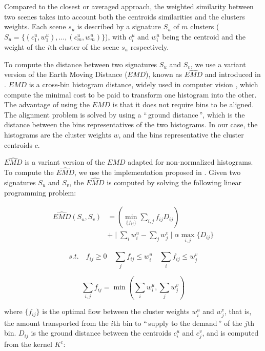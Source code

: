 \documentclass[journal]{IEEEtran}
\begin{document}
Compared to the closest or averaged approach, the  weighted similarity between two scenes takes into account both the centroids similarities and the clusters weights. Each scene $s_u$ is described by a signature $S_u$ of $m$ clusters ($S_u=\lbrace(c_1^u,w_1^u),\ldots,(c_m^u,w_m^u)\rbrace$), with $c_i^u$ and $w_i^u$ being the centroid and the weight of the $i$th cluster of the scene $s_u$ respectively. 

To compute the distance between two signatures $S_u$ and $S_v$, we use a variant version of the Earth Moving Distance ($EMD$), known as $\widehat{EMD}$ and introduced in \cite{pele2008linear}. $EMD$ is a cross-bin histogram distance, widely used in computer vision \cite{zhang2007local}, which compute the minimal cost to be paid to transform one histogram into the other. The advantage of using the $EMD$ is that it does not require bins to be aligned. The alignment problem is solved by using a ``\,ground distance\,'', which is the distance between the bins representatives of the two histograms. In our case, the histograms are the cluster weights $w$, and the bins representative the cluster centroids $c$.

$\widehat{EMD}$ is a variant version of the $EMD$ adapted for non-normalized histograms. To compute the $\widehat{EMD}$, we use the implementation proposed in \cite{pele2009fast}. Given two signatures $S_u$ and $S_v$, the $\widehat{EMD}$ is computed by solving the following linear programming problem:

\begin{equation}
\begin{split}
\widehat{EMD}(S_u,S_v) &=( \min\limits_{\lbrace f_{ij}\rbrace} \sum\limits_{i,j} f_{ij}D_{ij} )  \\ 
&+ \mid \sum\limits_{i} w_i^u - \sum\limits_{j} w_j^v  \mid \alpha \max\limits_{i,j}\lbrace  D_{ij}\rbrace
\end{split}
\end{equation}

\begin{equation*}
s.t. \quad f_{ij}\geq0 \quad \sum\limits_{j} f_{ij} \leq w_i^u \quad \sum\limits_{i} f_{ij} \leq w_j^v 
\end{equation*}

\begin{equation*}
\sum\limits_{i,j}f_{ij} = \min( \sum\limits_{i} w_i^u ,\sum\limits_{j} w_j^v )
\end{equation*}

where $\lbrace f_{ij} \rbrace$ is the optimal flow between the cluster weights $w_i^u$ and $w_j^v$, that is, the amount transported from the $i$th bin to ``\,supply to the demand\,'' of the $j$th bin. $D_{ij}$ is the ground distance between the centroids $c_i^u$ and $c_j^v$, and is computed from the kernel $K^c$:
\end{document}
